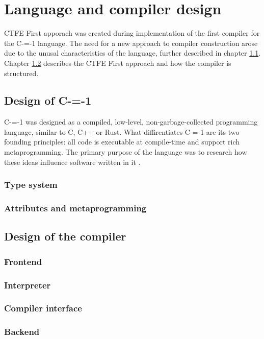 \section{Language and compiler design}
\label{language-compiler-design}

CTFE First apporach was created during implementation of the first compiler for the C-=-1 language\cite{grabski2022compilation}.
The need for a new approach to compiler construction arose due to the unusal characteristics of the language, further described in chapter \ref{language-design}.
Chapter \ref{compiler-design} describes the CTFE First approach and how the compiler is structured. 

\subsection{Design of C-=-1}
\label{language-design}

C-=-1 was designed as a compiled, low-level, non-garbage-collected programming language, similar to C, C++ or Rust.
What diffirentiates C-=-1 are its two founding principles: all code is executable at compile-time and support rich metaprogramming.
The primary purpose of the language was to research how these ideas influence software written in it \cite{grabski2022compilation}.

\subsubsection{Type system}

\subsubsection{Attributes and metaprogramming}

\subsection{Design of the compiler}
\label{compiler-design}
\subsubsection{Frontend}

\subsubsection{Interpreter}

\subsubsection{Compiler interface}

\subsubsection{Backend}
